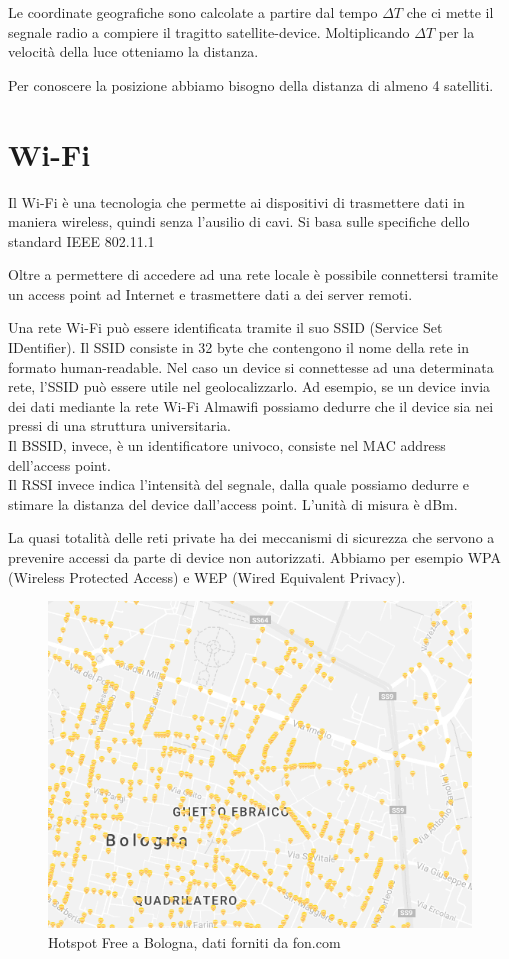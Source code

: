 \documentclass[12pt,a4paper,openright,twoside]{report}
\begin{document}
Le coordinate geografiche sono calcolate a partire dal tempo $ \Delta T $ che ci mette il segnale radio a compiere il tragitto satellite-device. Moltiplicando $ \Delta T $ per la velocità della luce otteniamo la distanza. 

Per conoscere la posizione abbiamo bisogno della distanza di almeno 4 satelliti.

\section{Wi-Fi}
Il Wi-Fi è una tecnologia che permette ai dispositivi di trasmettere dati in maniera wireless, quindi senza l'ausilio di cavi. Si basa sulle specifiche dello standard IEEE 802.11.1

Oltre a permettere di accedere ad una rete locale è possibile connettersi tramite un access point ad Internet e trasmettere dati a dei server remoti.

Una rete Wi-Fi può essere identificata tramite il suo SSID (Service Set IDentifier). Il SSID consiste in 32 byte che contengono il nome della rete in formato human-readable. Nel caso un device si connettesse ad una determinata rete, l'SSID può essere utile nel geolocalizzarlo. 
Ad esempio, se un device invia dei dati mediante la rete Wi-Fi Almawifi possiamo dedurre che il device sia nei pressi di una struttura universitaria.\\
Il BSSID, invece, è un identificatore univoco, consiste nel MAC address dell'access point. \\
Il RSSI invece indica l'intensità del segnale, dalla quale possiamo dedurre e stimare la distanza del device dall'access point. L'unità di misura è dBm.

La quasi totalità delle reti private ha dei meccanismi di sicurezza che servono a prevenire accessi da parte di device non autorizzati. 
Abbiamo per esempio WPA (Wireless Protected Access) e WEP (Wired Equivalent Privacy).

\begin{figure}[h!]
\centering 
\includegraphics[scale=0.6]{fig7} 
\caption{Hotspot Free a Bologna, dati forniti da fon.com \cite{K16}} 
\end{figure}
\end{document}
